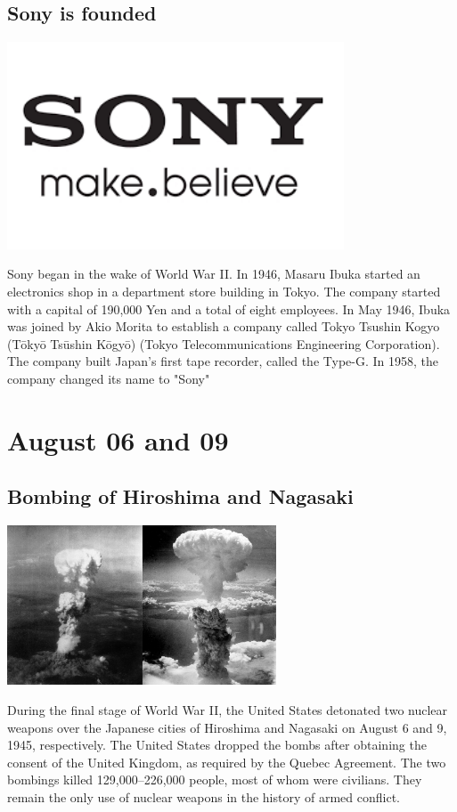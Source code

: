 \documentclass[11pt]{report}
\begin{document}
\subsection{Sony is founded}
\vspace{2mm}\begin{center}\includegraphics[width=10cm]{./img/sonylogo.png}\end{center}
Sony began in the wake of World War II. In 1946, Masaru Ibuka started an electronics shop in a department store building in Tokyo. The company started with a capital of 190,000 Yen and a total of eight employees. In May 1946, Ibuka was joined by Akio Morita to establish a company called Tokyo Tsushin Kogyo (Tōkyō Tsūshin Kōgyō) (Tokyo Telecommunications Engineering Corporation). The company built Japan's first tape recorder, called the Type-G. In 1958, the company changed its name to "Sony"

\section{August 06 and 09}
\subsection{Bombing of Hiroshima and Nagasaki}
\vspace{2mm}\begin{center}\includegraphics[width=8cm]{./img/hiroNagabombing.jpg}\end{center}
During the final stage of World War II, the United States detonated two nuclear weapons over the Japanese cities of Hiroshima and Nagasaki on August 6 and 9, 1945, respectively. The United States dropped the bombs after obtaining the consent of the United Kingdom, as required by the Quebec Agreement. The two bombings killed 129,000–226,000 people, most of whom were civilians. They remain the only use of nuclear weapons in the history of armed conflict.
\end{document}
